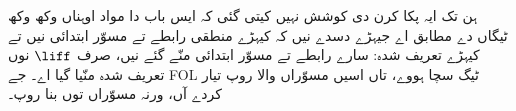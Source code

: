 \documentclass[../../../include/open-logic-chapter]{subfiles}
\begin{document}
      {}
      {}

\begin{editorial}
  ہن تک ایہ پکا کرن دی کوشش نہیں کیتی گئی کہ ایس باب دا مواد اوہناں
  وکھ وکھ ٹیگاں دے مطابق اے جیہڑے دسدے نیں کہ کیہڑے منطقی رابطے تے
  مسوّر ابتدائی نیں تے کیہڑے تعریف شدہ: سارے رابطے تے مسوّر ابتدائی
  منّے گئے نیں، صرف $\liff$ نوں تعریف شدہ منّیا گیا اے۔ جے FOL
  ٹیگ سچا ہووے، تاں اسیں مسوّراں والا روپ تیار کردے آں، ورنہ
  مسوّراں توں بنا روپ۔
\end{editorial}














\OLEndChapterHook
\end{document}
